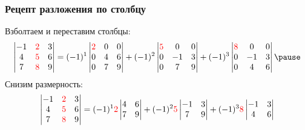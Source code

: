 \begin{frame}
\frametitle{Рецепт разложения по столбцу}
Взболтаем и переставим столбцы:
\[
    \begin{vmatrix}
        -1 & \red{2} & 3 \\
        4 & \red{5} & 6 \\
        7 & \red{8} & 9 \\
    \end{vmatrix}  =       
    (-1)^1 \begin{vmatrix}
        \red{2} & 0   & 0 \\
        0 & 4  & 6 \\
        0 & 7  & 9 \\
    \end{vmatrix} +
    (-1)^2 \begin{vmatrix}
        \red{5} & 0 & 0 \\
       0 & -1 & 3 \\
        0 & 7 & 9 \\
    \end{vmatrix} +
    (-1)^3\begin{vmatrix}
        \red{8} & 0 & 0 \\
        0 & -1 & 3 \\
        0 & 4 & 6 \\
    \end{vmatrix} \pause
\]
Снизим размерность:
\[
    \begin{vmatrix}
        -1 & \textcolor{red}{2} & 3 \\
        4 & \textcolor{red}{5} & 6 \\
        7 & \textcolor{red}{8} & 9 \\
    \end{vmatrix}  =       
    (-1)^1 \textcolor{red}{2} \begin{vmatrix}
         4  & 6 \\
         7  & 9 \\
    \end{vmatrix} +
    (-1)^2 \textcolor{red}{5}\begin{vmatrix}
        -1 & 3 \\
         7 & 9 \\
    \end{vmatrix} +
    (-1)^3 \textcolor{red}{8} \begin{vmatrix}
         -1 & 3 \\
         4 & 6 \\
    \end{vmatrix} 
\]




\end{frame}


